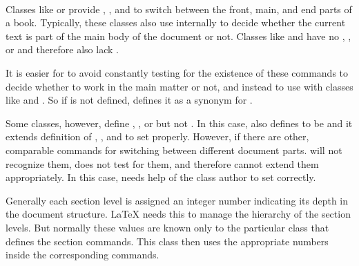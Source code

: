 \begin{Declaration}
  \ \ %
  \ \ %
\end{Declaration}
Classes like  or  provide
,
, and
 to switch between the
front, main, and end parts of a book. Typically, these classes also use
 internally to decide whether the current text is part of
the main body of the document or not. Classes like  and
 have no ,
, or  and
therefore also lack .

It is easier for  to avoid constantly testing for the
existence of these commands to decide whether to work in the main matter or
not, and instead to use   with classes
like  and . So if  is not
defined,  defines it as a synonym for .

Some classes, however, define ,
, or  but not
. In this case,  also defines
 to be  and it extends definition of
, , and
 to set  properly.
However, if there are other, comparable commands for switching between
different document parts.  will not recognize them, does not
test for them, and therefore cannot extend them appropriately. In this case,
 needs help of the class author to set 
correctly.%
\EndIndexGroup


\begin{Declaration}
\end{Declaration}
Generally each section level is assigned an integer number indicating its
depth in the document structure. \LaTeX{} needs this to manage the hierarchy
of the section levels. But normally these values are known only to the
particular class that defines the section commands. This class then uses the
appropriate numbers inside the corresponding commands.

